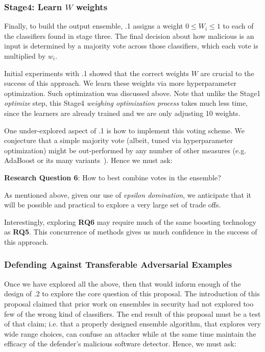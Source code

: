 \subsubsection{Stage4: Learn $W$ weights} 
Finally, to build the output ensemble,
{\IT}.1 assigns a weight $0\le W_i\le 1$ to each of the  classifiers
found in stage three. The final decision about how malicious
is an input is determined by a majority vote across those classifiers,
which each vote is multiplied by $w_i$.

Initial experiments with {\IT}.1 showed that the correct weights $W$
are crucial to the success of this approach. We learn these weights via
more hyperparameter optimization. Such optimization was discussed above.
Note that unlike 
the Stage1 {\em optimize} step, this  Stage4 {\em weighing optimization process} takes much less time, since the learners are already trained and we are only adjusting 10 weights.

One under-explored aspect of {\IT}.1 is how to implement this voting
scheme. We conjecture that a simple majority vote (albeit, tuned via 
hyperparameter optimization) might be out-performed by any number of other
measures (e.g. AdaBoost or its many variants~\cite{Freund2009}).
Hence we must ask:\begin{blockquote}
\noindent
\textbf{Research Question 6}:  
 How to best combine votes in the ensemble?
\end{blockquote} 

As mentioned above,  given our use of {\em epsilon domination},
we anticipate that it will be possible and
practical to explore a very large set of
trade offs.

Interestingly, exploring {\bf RQ6} may require much of the same boosting technology
as {\bf RQ5}. This concurrence of methods gives us much confidence in the success of this approach.

 

 \subsubsection{Defending Against Transferable Adversarial Examples}  
   Once we have explored all the above, then that would inform enough of the design
  of {\IT}.2 to explore the core question of this proposal.
  The introduction of this proposal claimed that prior
work on ensembles in security had not explored too few of the wrong
kind of classifiers. The end result of this proposal
must  be a test of that claim;
i.e. that  a  properly designed ensemble algorithm,
that explores very wide range   choices, can
confuse an attacker while at the same time maintain the efficacy
of the defender's malicious software detector. Hence, we must ask:
    
